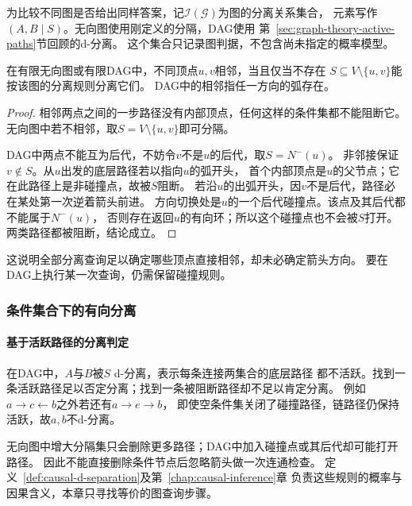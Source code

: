 为比较不同图是否给出同样答案，记\(\mathcal I(\mathcal G)\)为图的分离关系集合，
元素写作\((A,B\mid S)\)。无向图使用刚定义的分隔，DAG使用
第~\ref{sec:graph-theory-active-paths}节回顾的d-分离。
这个集合只记录图判据，不包含尚未指定的概率模型。

\begin{lemma}[分离关系中的邻接判据]
  \label{lem:graph-theory-separation-adjacency}
  在有限无向图或有限DAG中，不同顶点\(u,v\)相邻，当且仅当不存在
  \(S\subseteq V\setminus\{u,v\}\)能按该图的分离规则分离它们。
  DAG中的相邻指任一方向的弧存在。
\end{lemma}

\begin{proof}
相邻两点之间的一步路径没有内部顶点，任何这样的条件集都不能阻断它。
无向图中若不相邻，取\(S=V\setminus\{u,v\}\)即可分隔。

DAG中两点不能互为后代，不妨令\(v\)不是\(u\)的后代，取\(S=N^-(u)\)。
非邻接保证\(v\notin S\)。从\(u\)出发的底层路径若以指向\(u\)的弧开头，
首个内部顶点是\(u\)的父节点；它在此路径上是非碰撞点，故被\(S\)阻断。
若沿\(u\)的出弧开头，因\(v\)不是后代，路径必在某处第一次逆着箭头前进。
方向切换处是\(u\)的一个后代碰撞点。该点及其后代都不能属于\(N^-(u)\)，
否则存在返回\(u\)的有向环；所以这个碰撞点也不会被\(S\)打开。
两类路径都被阻断，结论成立。
\end{proof}

这说明全部分离查询足以确定哪些顶点直接相邻，却未必确定箭头方向。
要在DAG上执行某一次查询，仍需保留碰撞规则。

\subsubsection{条件集合下的有向分离}
\label{sec:graph-theory-conditional-separation}

\paragraph{基于活跃路径的分离判定}

在DAG中，\(A\)与\(B\)被\(S\) d-分离，表示每条连接两集合的底层路径
都不活跃。找到一条活跃路径足以否定分离；找到一条被阻断路径却不足以肯定分离。
例如\(a\to c\leftarrow b\)之外若还有\(a\to e\to b\)，
即使空条件集关闭了碰撞路径，链路径仍保持活跃，故\(a,b\)不d-分离。

无向图中增大分隔集只会删除更多路径；DAG中加入碰撞点或其后代却可能打开路径。
因此不能直接删除条件节点后忽略箭头做一次连通检查。
定义~\ref{def:causal-d-separation}及第~\ref{chap:causal-inference}章
负责这些规则的概率与因果含义，本章只寻找等价的图查询步骤。

